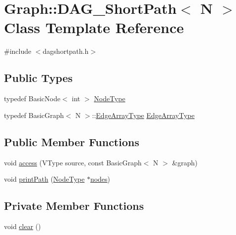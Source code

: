 \hypertarget{class_graph_1_1_d_a_g___short_path}{}\section{Graph\+:\+:D\+A\+G\+\_\+\+Short\+Path$<$ N $>$ Class Template Reference}
\label{class_graph_1_1_d_a_g___short_path}


{\ttfamily \#include $<$dagshortpath.\+h$>$}

\subsection*{Public Types}
\begin{DoxyCompactItemize}
\item 
typedef Basic\+Node$<$ int $>$ \hyperlink{class_graph_1_1_d_a_g___short_path_a8f3964a826d60ad359488d56ad78f0e6}{Node\+Type}
\item 
typedef Basic\+Graph$<$ N $>$\+::\hyperlink{class_graph_1_1_d_a_g___short_path_a27c383b64a1c96d6d62623c88e52722b}{Edge\+Array\+Type} \hyperlink{class_graph_1_1_d_a_g___short_path_a27c383b64a1c96d6d62623c88e52722b}{Edge\+Array\+Type}
\end{DoxyCompactItemize}
\subsection*{Public Member Functions}
\begin{DoxyCompactItemize}
\item 
void \hyperlink{class_graph_1_1_d_a_g___short_path_aceb6532eadcc0ffe67685cda5896919e}{access} (V\+Type source, const Basic\+Graph$<$ N $>$ \&graph)
\item 
void \hyperlink{class_graph_1_1_d_a_g___short_path_adadd1974c5e3eda3c2480d6e3c2c7d4a}{print\+Path} (\hyperlink{class_graph_1_1_d_a_g___short_path_a8f3964a826d60ad359488d56ad78f0e6}{Node\+Type} $\ast$\hyperlink{class_graph_1_1_d_a_g___short_path_a7818ffaf2695c21ff4b44b65126f5897}{nodes})
\end{DoxyCompactItemize}
\subsection*{Private Member Functions}
\begin{DoxyCompactItemize}
\item 
void \hyperlink{class_graph_1_1_d_a_g___short_path_ac89e6307d0e43e9d499d3e8c59ac3867}{clear} ()
\end{DoxyCompactItemize}
